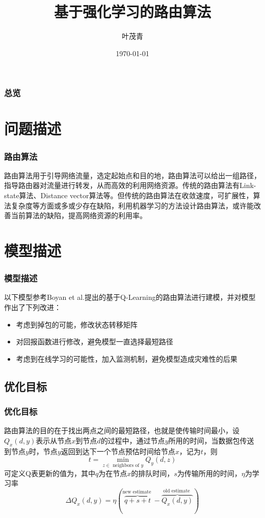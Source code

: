 \documentclass[hyperref={pdfpagelabels=false}]{beamer}
\title{基于强化学习的路由算法}
\author{叶茂青}
\date{\today}
\begin{document}
\begin{frame}
\titlepage
\end{frame} 

\begin{frame}
	\frametitle{总览}
	\tableofcontents
\end{frame} 

\section{问题描述}

\begin{frame}
	\frametitle{路由算法}
	路由算法用于引导网络流量，选定起始点和目的地，路由算法可以给出一组路径，指导路由器对流量进行转发，从而高效的利用网络资源。传统的路由算法有Link-state算法、Distance vector算法等。但传统的路由算法在收敛速度，可扩展性，算法复杂度等方面或多或少存在缺陷，利用机器学习的方法设计路由算法，或许能改善当前算法的缺陷，提高网络资源的利用率。
\end{frame}


\section{模型描述}

\begin{frame}
	\frametitle{模型描述}
	以下模型参考Boyan et al.\cite{boyan1994packet}提出的基于Q-Learning的路由算法进行建模，并对模型作出了下列改进：
	\begin{itemize}
		\item 考虑到掉包的可能，修改状态转移矩阵
		\item 对回报函数进行修改，避免模型一直选择最短路径
		\item 考虑到在线学习的可能性，加入监测机制，避免模型造成灾难性的后果
	\end{itemize}

\end{frame}

\subsection{优化目标}
\begin{frame}
	\frametitle{优化目标}
	路由算法的目的在于找出两点之间的最短路径，也就是使传输时间最小，设$Q_x(d,y)$表示从节点$x$到节点$d$的过程中，通过节点$y$所用的时间，当数据包传送到节点$y$时，节点$y$返回到达下一个节点预估时间给节点$x$，记为$t$，则
	\[
		t=\min _{z \in \text { neighbors of } y} Q_{y}(d, z)
	\]
	可定义Q表更新的值为，其中$q$为在节点$x$的排队时间，$s$为传输所用的时间，$\eta$为学习率
	\[
		\Delta Q_{x}(d, y)=\eta(\overbrace{q+s+t}^{\text {new estimate }}-\overbrace{Q_{x}(d, y)}^{\text {old estimate }})
	\]
\end{frame}
\end{document}
